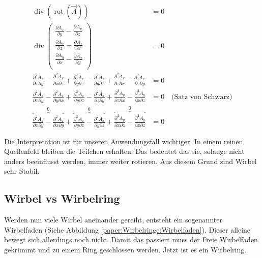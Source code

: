 \begin{align}
\operatorname{div} \left( \operatorname{rot} \left( \vec{A} \right) \right) 
&= 0\\
\operatorname{div}      
    \begin{pmatrix} 
        \frac{\partial A_z}{\partial y} - \frac{\partial A_y}{\partial z} \\ 
        \frac{\partial A_x}{\partial z} - \frac{\partial A_z}{\partial x} \\ 
        \frac{\partial A_y}{\partial x} - \frac{\partial A_x}{\partial y} \\ 
    \end{pmatrix} 
&= 0\\
\frac{\partial^2 A_z}{\partial x \partial y} - \frac{\partial^2 A_y}{\partial x \partial z} + 
\frac{\partial^2 A_x}{\partial y \partial z} - \frac{\partial^2 A_z}{\partial y \partial x} +
\frac{\partial^2 A_y}{\partial z \partial x} - \frac{\partial^2 A_x}{\partial z \partial y}
&= 0\\
\frac{\partial^2 A_z}{\partial x \partial y} - \frac{\partial^2 A_z}{\partial y \partial x} + 
\frac{\partial^2 A_x}{\partial y \partial z} - \frac{\partial^2 A_x}{\partial z \partial y} +
\frac{\partial^2 A_y}{\partial z \partial x} - \frac{\partial^2 A_y}{\partial x \partial z}
&= 0 \quad \text{(Satz von Schwarz)}\\
\overbrace{\frac{\partial^2 A_z}{\partial x \partial y} - \frac{\partial^2 A_z}{\partial x \partial y}}^0 + 
\overbrace{\frac{\partial^2 A_x}{\partial y \partial z} - \frac{\partial^2 A_x}{\partial y \partial z}}^0 +
\overbrace{\frac{\partial^2 A_y}{\partial x \partial z} - \frac{\partial^2 A_y}{\partial x \partial z}}^0
&= 0 
\end{align}

Die Interpretation ist für unseren Anwendungsfall wichtiger. 
In einem reinen Quellenfeld bleiben die Teilchen erhalten. 
Das bedeutet das sie, solange nicht anders beeinflusst werden, immer weiter rotieren. 
Aus diesem Grund sind Wirbel sehr Stabil.


\subsection{Wirbel vs Wirbelring}

Werden nun viele Wirbel aneinander gereiht, entsteht ein sogenannter Wirbelfaden (Siehe Abbildung \ref{paper:Wirbelringe:Wirbelfaden}).
Dieser alleine bewegt sich allerdings noch nicht. 
Damit das passiert muss der Freie Wirbelfaden gekrümmt und zu einem Ring geschlossen werden. 
Jetzt ist es ein Wirbelring.
